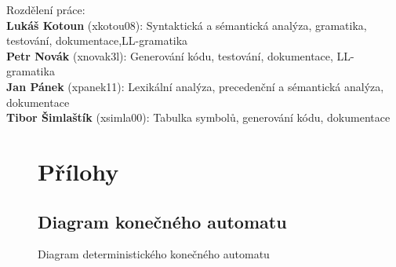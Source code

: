 \documentclass[11pt]{article}
\begin{document}
Rozdělení práce: \\[1em]
\textbf{Lukáš Kotoun} (xkotou08): Syntaktická a sémantická analýza, gramatika, testování, dokumentace,LL-gramatika \\
\textbf{Petr Novák} (xnovak3l): Generování kódu, testování, dokumentace, LL-gramatika \\
\textbf{Jan Pánek} (xpanek11): Lexikální analýza, precedenční a sémantická analýza, dokumentace \\
\textbf{Tibor Šimlaštík} (xsimla00): Tabulka symbolů, generování kódu, dokumentace    \\





\begin{landscape}
    \thispagestyle{empty}
    \begin{figure}[!h]
        \section{Přílohy}
        \subsection{Diagram konečného automatu}
        \begin{center}
        \caption{Diagram deterministického konečného automatu}
        \label{fig:fsm}
        \end{center}
    \end{figure}
\end{landscape}
\restoregeometry
\end{document}
